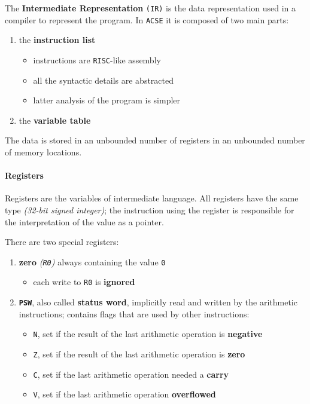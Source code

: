 The \textbf{Intermediate Representation} \texttt{(IR)} is the data representation used in a compiler to represent the program.
In \texttt{ACSE} it is composed of two main parts:

\begin{enumerate}
  \item the \textbf{instruction list}
        \begin{itemize}[label=\textbf{\texttt{>}}]
          \item instructions are \texttt{RISC}-like assembly
          \item all the syntactic details are abstracted
          \item latter analysis of the program is simpler
        \end{itemize}
  \item the \textbf{variable table}
\end{enumerate}

The data is stored in an unbounded number of registers in an unbounded number of memory locations.

\paragraph*{Registers}
Registers are the variables of intermediate language.
All registers have the same type \textit{(32-bit signed integer)}; the instruction using the register is responsible for the interpretation of the value as a pointer.

There are two special registers:
\begin{enumerate}[label=\textbf{\texttt{>}}]
  \item \textbf{zero} \textit{(\texttt{R0})} always containing the value \texttt{0}
        \begin{itemize}[label=\textbf{\texttt{>}}]
          \item each write to \texttt{R0} is \textbf{ignored}
        \end{itemize}
  \item \textbf{\texttt{PSW}}, also called \textbf{status word}, implicitly read and written by the arithmetic instructions; contains flags that are used by other instructions:
        \begin{itemize}[label=\textbf{\texttt{>}}]
          \item\texttt{N}, set if the result of the last arithmetic operation is \textbf{negative}
          \item\texttt{Z}, set if the result of the last arithmetic operation is \textbf{zero}
          \item\texttt{C}, set if the last arithmetic operation needed a \textbf{carry}
          \item\texttt{V}, set if the last arithmetic operation \textbf{overflowed}
        \end{itemize}
\end{enumerate}

